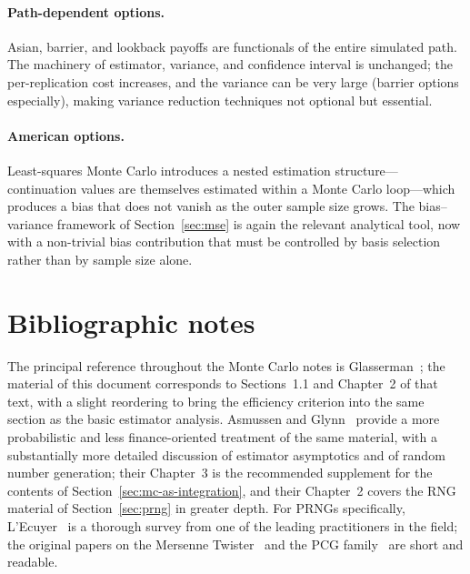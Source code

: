 \documentclass[11pt,a4paper]{article}
\theoremstyle{plain}
\theoremstyle{definition}
\theoremstyle{remark}
\begin{document}
\paragraph{Path-dependent options.} Asian, barrier, and
lookback payoffs are functionals of the entire simulated path. The
machinery of estimator, variance, and confidence interval is unchanged;
the per-replication cost increases, and the variance can be very large
(barrier options especially), making variance reduction techniques
not optional but essential.

\paragraph{American options.} Least-squares Monte Carlo
introduces a nested estimation structure---continuation values are
themselves estimated within a Monte Carlo loop---which produces a bias
that does not vanish as the outer sample size grows. The bias--variance
framework of Section~\ref{sec:mse} is again the relevant analytical
tool, now with a non-trivial bias contribution that must be controlled
by basis selection rather than by sample size alone.

\section{Bibliographic notes}
\label{sec:biblio}

The principal reference throughout the Monte Carlo notes is
Glasserman~\cite{Glasserman}; the material of this document corresponds
to Sections~1.1 and Chapter~2 of that text, with a slight reordering
to bring the efficiency criterion into the same section as the basic
estimator analysis. Asmussen and Glynn~\cite{AsmussenGlynn} provide a
more probabilistic and less finance-oriented treatment of the same
material, with a substantially more detailed discussion of estimator
asymptotics and of random number generation; their Chapter~3 is the
recommended supplement for the contents of
Section~\ref{sec:mc-as-integration}, and their Chapter~2 covers the
RNG material of Section~\ref{sec:prng} in greater depth. For PRNGs
specifically, L'Ecuyer~\cite{LEcuyer2012} is a thorough survey from one
of the leading practitioners in the field; the original papers on the
Mersenne Twister~\cite{Matsumoto1998} and the PCG
family~\cite{ONeill2014} are short and readable.
\end{document}
